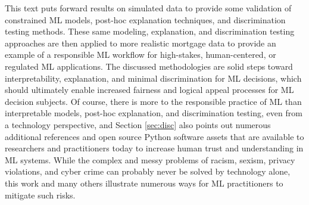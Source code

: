 \documentclass[information,article,accept,moreauthors,pdftex]{Definitions/mdpi}
\begin{document}
{This text puts forward results on simulated data to provide some validation of constrained ML models, post-hoc explanation techniques, and discrimination testing methods. These same modeling, explanation, and discrimination testing approaches are then applied to more realistic mortgage data to provide an example of a responsible ML workflow for high-stakes, human-centered, or regulated ML applications. The discussed methodologies are solid steps toward interpretability, explanation, and minimal discrimination for ML decisions, which should ultimately enable increased fairness and logical appeal processes for ML decision subjects. Of course, there is more to the responsible practice of ML than interpretable models, post-hoc explanation, and discrimination testing, even from a technology perspective, and Section \ref{sec:disc} also points out numerous additional references and open source Python software assets that are available to researchers and practitioners today to increase human trust and understanding in ML systems. While the complex and messy problems of racism, sexism, privacy violations, and cyber crime can probably never be solved by technology alone, this work and many others illustrate numerous ways for ML practitioners to mitigate such risks. 

\vspace{+6pt}


}
\end{document}
